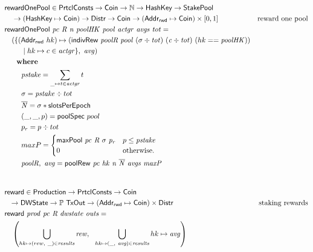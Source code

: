 \begin{figure}[htb]
  \begin{align*}
      & \fun{rewardOnePool} \in \PrtclConsts \to \Coin \to \mathbb{N} \to \HashKey \to \StakePool\\
      & ~~~\to (\HashKey \mapsto \Coin)\to \Distr \to \Coin \to (\AddrRWD \mapsto \Coin)\times[0, 1]
      & \text{reward one pool} \\
      & \fun{rewardOnePool}~\var{pc}~\var{R}~\var{n}~\var{poolHK}~\var{pool}
        ~\var{actgr}~\var{avgs}~\var{tot} = \\
      & ~~~(\{ (\AddrRWD~hk)\mapsto ( \fun{indivRew}~\var{poolR}~\var{pool}
                                 ~(\sigma\div\var{tot})~(\var{c}\div\var{tot})~(hk ==\var{poolHK})) \\
      & ~~~~~~~\mid hk\mapsto c\in\var{actgr}\},~\var{avg})\\
      & ~~~\where \\
      & ~~~~~~~\var{pstake} = \sum_{\_\mapsto t\in\var{actgr}} t \\
      & ~~~~~~~\sigma = \var{pstake} \div tot \\
      & ~~~~~~~\var{\overline{N}} = \sigma * \slotsPer\\
      & ~~~~~~~(\_, \_, p) = \fun{poolSpec}~pool \\
      & ~~~~~~~p_{r} = p \div tot \\
      & ~~~~~~~maxP =
      \begin{cases}
          \fun{maxPool}~\var{pc}~\var{R}~\sigma~\var{p_r}&
              p \leq \var{pstake}\\
          0 & \text{otherwise.}
        \end{cases} \\
      & ~~~~~~~\var{poolR},~\var{avg} = \fun{poolRew}~\var{pc}~\var{hk}~\var{n}~\var{\overline{N}}~\var{avgs}~\var{maxP} \\
      \nextdef
      & \fun{reward} \in \Production \to \PrtclConsts \to \Coin \\
      & ~~ \to \DWState \to \powerset{\TxOut} \to (\AddrRWD \mapsto \Coin)\times\Distr
      & \text{staking rewards} \\
      & \fun{reward}~\var{prod}~\var{pc}~\var{R}~\var{dwstate}~\var{outs} = \\
      & ~~~\left(
           \bigcup_{hk\mapsto(rew,~\_)\in\var{results}} \var{rew},
           ~~\bigcup_{hk\mapsto(\_,~\var{avg})\in\var{results}} hk\mapsto\var{avg}
           \right)\\

\end{align*}
\end{figure}
